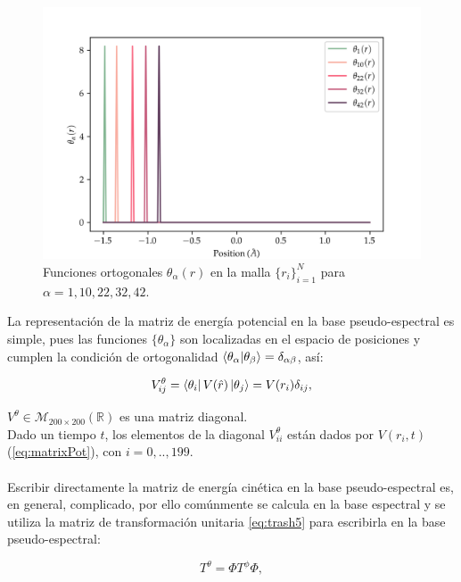 \begin{figure}[ht]
  \centering
  \includegraphics[width=1\textwidth]{./img/theta_n1.png}
  \caption{Funciones ortogonales $\theta_{\alpha}(r)$ en la malla $\{r_i\}_{i=1}^{N}$ para $\alpha=1,10,22,32,42$.}
  \label{fig:theta_n}
\end{figure}

La representación de la matriz de energía potencial en la base pseudo-espectral es simple, pues 
las funciones $\{\theta_{\alpha}\}$ son localizadas en el espacio de posiciones y cumplen la condición de ortogonalidad $\bra{\theta_{\alpha}}\ket{\theta_{\beta}}= \delta_{\alpha \beta}$, así:

\begin{equation}
  \label{eq:V_DVR}
  V^{\theta}_{ij}= \bra{\theta_i}V(\hat{r})\ket{\theta_j}=V(r_i)\delta_{ij},
\end{equation}

\noindent $V^{\theta}\in \mathcal{M}_{200\times200}(\mathbb{R})$ es una matriz diagonal.
\\
Dado un tiempo $t$, los elementos de la diagonal $V^{\theta}_{ii}$ están dados por $V(r_i,t)$ (\autoref{eq:matrixPot}), con $i=0,..,199$.
\\
\\
Escribir directamente la matriz de energía cinética en la base pseudo-espectral es, en general, complicado, por ello comúnmente se calcula en la base espectral y se utiliza la matriz de transformación unitaria \autoref{eq:trash5} para escribirla en la base pseudo-espectral:

\begin{equation}
  \label{eq:trash6}
  T^{\theta} = \Phi T^{\phi} \Phi,
\end{equation}

